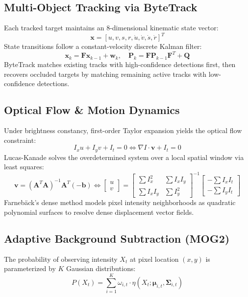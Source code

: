 \documentclass[12pt,a4paper]{article}
\begin{document}
\subsection{Multi-Object Tracking via ByteTrack}
Each tracked target maintains an 8-dimensional kinematic state vector:
\begin{equation}
\mathbf{x} = [u, v, s, r, \dot{u}, \dot{v}, \dot{s}, \dot{r}]^T
\end{equation}
State transitions follow a constant-velocity discrete Kalman filter:
\begin{equation}
\mathbf{x}_k = \mathbf{F} \mathbf{x}_{k-1} + \mathbf{w}_k, \quad \mathbf{P}_k = \mathbf{F} \mathbf{P}_{k-1} \mathbf{F}^T + \mathbf{Q}
\end{equation}
ByteTrack matches existing tracks with high-confidence detections first, then recovers occluded targets by matching remaining active tracks with low-confidence detections.

\subsection{Optical Flow \& Motion Dynamics}
Under brightness constancy, first-order Taylor expansion yields the optical flow constraint:
\begin{equation}
I_x u + I_y v + I_t = 0 \iff \nabla I \cdot \mathbf{v} + I_t = 0
\end{equation}
Lucas-Kanade solves the overdetermined system over a local spatial window via least squares:
\begin{equation}
\mathbf{v} = (\mathbf{A}^T \mathbf{A})^{-1} \mathbf{A}^T (-\mathbf{b}) \iff \begin{bmatrix} u \\ v \end{bmatrix} = \begin{bmatrix} \sum I_x^2 & \sum I_x I_y \\ \sum I_x I_y & \sum I_y^2 \end{bmatrix}^{-1} \begin{bmatrix} -\sum I_x I_t \\ -\sum I_y I_t \end{bmatrix}
\end{equation}
Farneb\"ack's dense method models pixel intensity neighborhoods as quadratic polynomial surfaces to resolve dense displacement vector fields.

\subsection{Adaptive Background Subtraction (MOG2)}
The probability of observing intensity $X_t$ at pixel location $(x, y)$ is parameterized by $K$ Gaussian distributions:
\begin{equation}
P(X_t) = \sum_{i=1}^{K} \omega_{i, t} \cdot \eta(X_t; \boldsymbol{\mu}_{i, t}, \boldsymbol{\Sigma}_{i, t})
\end{equation}
\end{document}
